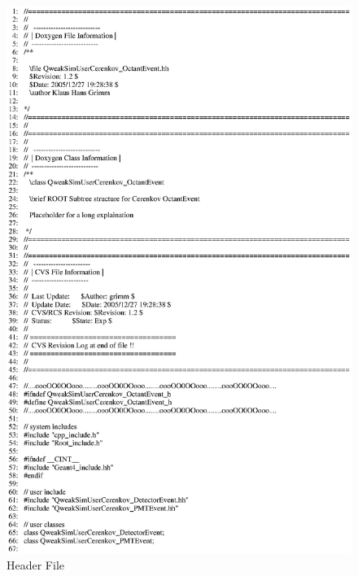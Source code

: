 \clearpage

\begin{figure}[ht]
  \hspace{0cm}
  \includegraphics[scale=0.8]{./figures5/QweakSimUserCerenkov_OctantEvent.hh-p1.eps}
  \caption{\label{SourceV28} Header File}
           \label{fig:V-SC-32}
\end{figure}

\clearpage

